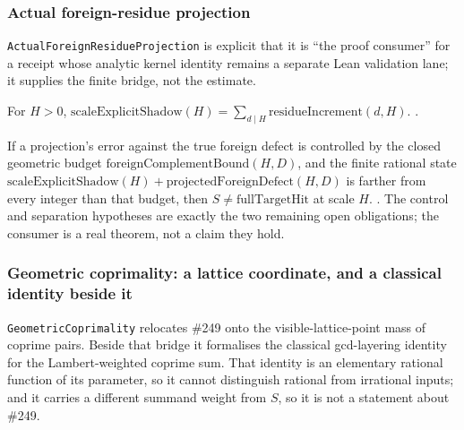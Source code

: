 \subsubsection{Actual foreign-residue projection}

\texttt{ActualForeignResidueProjection} is explicit that it is ``the proof
consumer'' for a receipt whose analytic kernel identity remains a separate
Lean validation lane; it supplies the finite bridge, not the estimate.

\begin{prop}
For $H>0$, $\mathrm{scaleExplicitShadow}(H) = \sum_{d\mid H}
\mathrm{residueIncrement}(d,H)$.
\quad {} \quad {} \quad {}.
\end{prop}

\begin{prop}
If a projection's error against the true foreign defect is controlled by
the closed geometric budget $\mathrm{foreignComplementBound}(H,D)$, and the
finite rational state $\mathrm{scaleExplicitShadow}(H) +
\mathrm{projectedForeignDefect}(H,D)$ is farther from every integer than
that budget, then $S\ne \mathrm{fullTargetHit}$ at scale $H$.
\quad {} \quad {} \quad {}. The
control and separation hypotheses are exactly the two remaining open
obligations; the consumer is a real theorem, not a claim they hold.
\end{prop}

\subsubsection{Geometric coprimality: a lattice coordinate, and a classical identity beside it}

\texttt{GeometricCoprimality} relocates \#249 onto the visible-lattice-point
mass of coprime pairs. Beside that bridge it formalises the classical
gcd-layering identity for the Lambert-weighted coprime sum. That identity is
an elementary rational function of its parameter, so it cannot distinguish
rational from irrational inputs; and it carries a different summand weight
from $S$, so it is not a statement about \#249.

